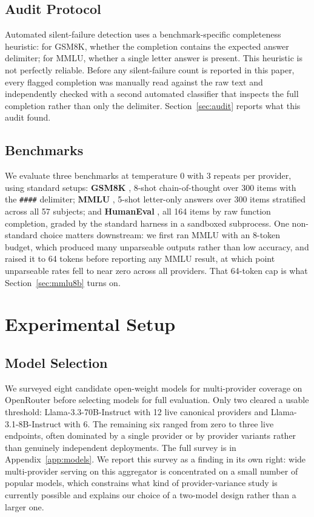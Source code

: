 \documentclass[11pt]{article}
\begin{document}
\subsection{Audit Protocol}

Automated silent-failure detection uses a benchmark-specific
completeness heuristic: for GSM8K, whether the completion contains the
expected answer delimiter; for MMLU, whether a single letter answer is
present. This heuristic is not perfectly reliable. Before any
silent-failure count is reported in this paper, every flagged
completion was manually read against the raw text and independently
checked with a second automated classifier that inspects the full
completion rather than only the delimiter. Section~\ref{sec:audit}
reports what this audit found.

\subsection{Benchmarks}

We evaluate three benchmarks at temperature 0 with 3 repeats per
provider, using standard setups: \textbf{GSM8K}
\citep{cobbe2021gsm8k}, 8-shot chain-of-thought over 300 items with
the \texttt{\#\#\#\#} delimiter; \textbf{MMLU}
\citep{hendrycks2021mmlu}, 5-shot letter-only answers over 300 items
stratified across all 57 subjects; and \textbf{HumanEval}
\citep{chen2021humaneval}, all 164 items by raw function completion,
graded by the standard harness in a sandboxed subprocess. One
non-standard choice matters downstream: we first ran MMLU with an
8-token budget, which produced many unparseable outputs rather than
low accuracy, and raised it to 64 tokens before reporting any MMLU
result, at which point unparseable rates fell to near zero across all
providers. That 64-token cap is what Section~\ref{sec:mmlu8b} turns
on.

\section{Experimental Setup}

\subsection{Model Selection}

We surveyed eight candidate open-weight models for multi-provider
coverage on OpenRouter before selecting models for full evaluation.
Only two cleared a usable threshold: Llama-3.3-70B-Instruct with 12
live canonical providers and Llama-3.1-8B-Instruct with 6. The
remaining six ranged from zero to three live endpoints, often
dominated by a single provider or by provider variants rather than
genuinely independent deployments. The full survey is in
Appendix~\ref{app:models}. We
report this survey as a finding in its own right: wide multi-provider
serving on this aggregator is concentrated on a small number of
popular models, which constrains what kind of provider-variance study
is currently possible and explains our choice of a two-model design
rather than a larger one.
\end{document}
